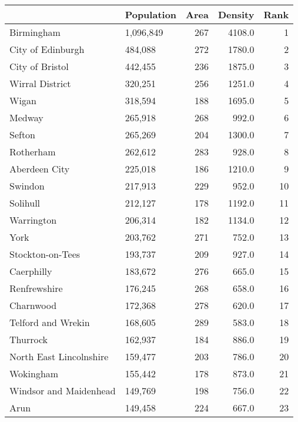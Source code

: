 \begin{tabular}{llrrr}
\toprule
{} & Population &  Area &  Density &  Rank \\
\midrule
Birmingham                &  1,096,849 &   267 &   4108.0 &     1 \\
City of Edinburgh         &    484,088 &   272 &   1780.0 &     2 \\
City of Bristol           &    442,455 &   236 &   1875.0 &     3 \\
Wirral District           &    320,251 &   256 &   1251.0 &     4 \\
Wigan                     &    318,594 &   188 &   1695.0 &     5 \\
Medway                    &    265,918 &   268 &    992.0 &     6 \\
Sefton                    &    265,269 &   204 &   1300.0 &     7 \\
Rotherham                 &    262,612 &   283 &    928.0 &     8 \\
Aberdeen City             &    225,018 &   186 &   1210.0 &     9 \\
Swindon                   &    217,913 &   229 &    952.0 &    10 \\
Solihull                  &    212,127 &   178 &   1192.0 &    11 \\
Warrington                &    206,314 &   182 &   1134.0 &    12 \\
York                      &    203,762 &   271 &    752.0 &    13 \\
Stockton-on-Tees          &    193,737 &   209 &    927.0 &    14 \\
Caerphilly                &    183,672 &   276 &    665.0 &    15 \\
Renfrewshire              &    176,245 &   268 &    658.0 &    16 \\
Charnwood                 &    172,368 &   278 &    620.0 &    17 \\
Telford and Wrekin        &    168,605 &   289 &    583.0 &    18 \\
Thurrock                  &    162,937 &   184 &    886.0 &    19 \\
North East Lincolnshire   &    159,477 &   203 &    786.0 &    20 \\
Wokingham                 &    155,442 &   178 &    873.0 &    21 \\
Windsor and Maidenhead    &    149,769 &   198 &    756.0 &    22 \\
Arun                      &    149,458 &   224 &    667.0 &    23 \\

\end{tabular}
